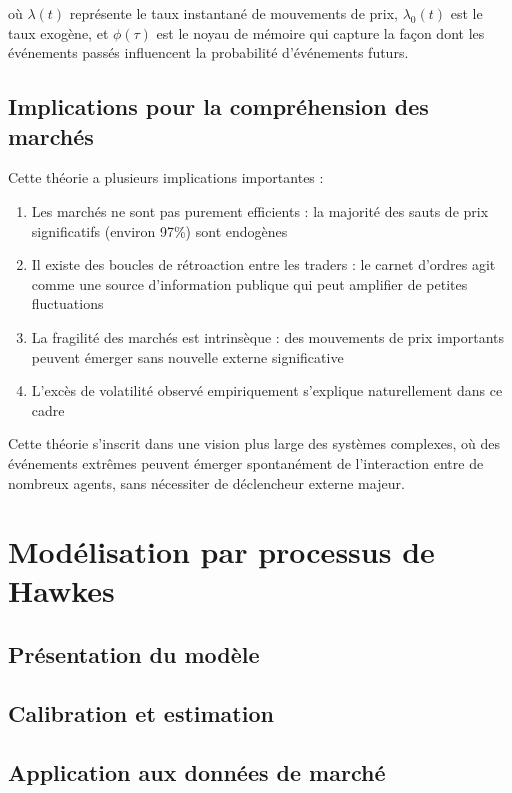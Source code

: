 \documentclass[12pt,a4paper]{article}
\theoremstyle{definition}
\theoremstyle{remark}
\begin{document}
où $\lambda(t)$ représente le taux instantané de mouvements de prix, $\lambda_0(t)$ est le taux exogène, et $\phi(\tau)$ est le noyau de mémoire qui capture la façon dont les événements passés influencent la probabilité d'événements futurs.

\subsection{Implications pour la compréhension des marchés}

Cette théorie a plusieurs implications importantes :

\begin{enumerate}
    \item Les marchés ne sont pas purement efficients : la majorité des sauts de prix significatifs (environ 97\%) sont endogènes
    \item Il existe des boucles de rétroaction entre les traders : le carnet d'ordres agit comme une source d'information publique qui peut amplifier de petites fluctuations
    \item La fragilité des marchés est intrinsèque : des mouvements de prix importants peuvent émerger sans nouvelle externe significative
    \item L'excès de volatilité observé empiriquement s'explique naturellement dans ce cadre
\end{enumerate}

Cette théorie s'inscrit dans une vision plus large des systèmes complexes, où des événements extrêmes peuvent émerger spontanément de l'interaction entre de nombreux agents, sans nécessiter de déclencheur externe majeur.

\section{Modélisation par processus de Hawkes}

\subsection{Présentation du modèle}

\subsection{Calibration et estimation}

\subsection{Application aux données de marché}
\end{document}
